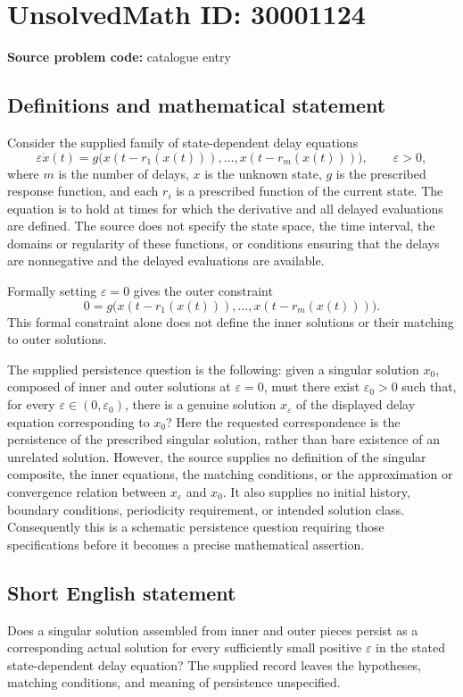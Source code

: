 \documentclass[11pt]{article}
\begin{document}
\section*{UnsolvedMath ID: 30001124}
\textbf{Source problem code:} catalogue entry
\subsection{Definitions and mathematical statement}
Consider the supplied family of state-dependent delay equations
\[
\varepsilon\dot x(t)=g\bigl(x(t-r_1(x(t))),\ldots,x(t-r_m(x(t)))\bigr),\qquad \varepsilon>0,
\]
where \(m\) is the number of delays, \(x\) is the unknown state, \(g\) is the prescribed response function, and each \(r_i\) is a prescribed function of the current state. The equation is to hold at times for which the derivative and all delayed evaluations are defined. The source does not specify the state space, the time interval, the domains or regularity of these functions, or conditions ensuring that the delays are nonnegative and the delayed evaluations are available.

Formally setting \(\varepsilon=0\) gives the outer constraint
\[
0=g\bigl(x(t-r_1(x(t))),\ldots,x(t-r_m(x(t)))\bigr).
\]
This formal constraint alone does not define the inner solutions or their matching to outer solutions.

The supplied persistence question is the following: given a singular solution \(x_0\), composed of inner and outer solutions at \(\varepsilon=0\), must there exist \(\varepsilon_0>0\) such that, for every \(\varepsilon\in(0,\varepsilon_0)\), there is a genuine solution \(x_\varepsilon\) of the displayed delay equation corresponding to \(x_0\)? Here the requested correspondence is the persistence of the prescribed singular solution, rather than bare existence of an unrelated solution. However, the source supplies no definition of the singular composite, the inner equations, the matching conditions, or the approximation or convergence relation between \(x_\varepsilon\) and \(x_0\). It also supplies no initial history, boundary conditions, periodicity requirement, or intended solution class. Consequently this is a schematic persistence question requiring those specifications before it becomes a precise mathematical assertion.
\subsection{Short English statement}
Does a singular solution assembled from inner and outer pieces persist as a corresponding actual solution for every sufficiently small positive \(\varepsilon\) in the stated state-dependent delay equation? The supplied record leaves the hypotheses, matching conditions, and meaning of persistence unspecified.
\end{document}
